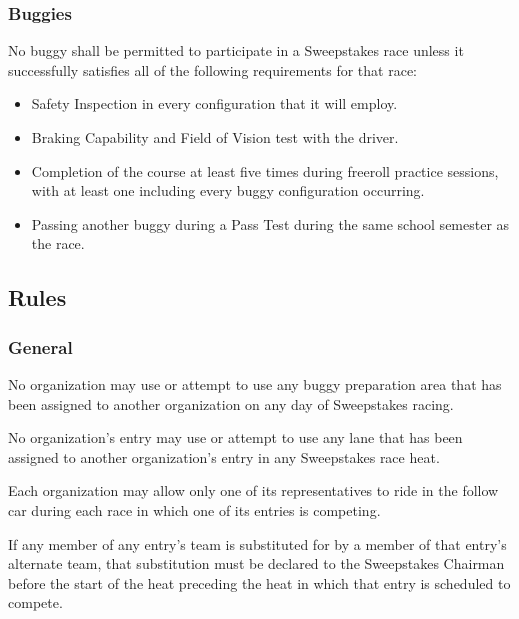 \subsubsection{Buggies}

	No buggy shall be permitted to participate in a Sweepstakes race unless it
	successfully satisfies all of the following requirements for that race:

	\begin{itemize}

		\item Safety Inspection in every configuration that it will employ.

		\item Braking Capability and Field of Vision test with the driver.
		
		\item Completion of the course at least five times during freeroll practice 
		sessions, with at least one including every buggy configuration occurring.

		\item Passing another buggy during a Pass Test during the same school 
		semester as the race.

	\end{itemize}

\subsection{Rules}

\subsubsection{General}

	No organization may use or attempt to use any buggy preparation area that has
	been assigned to another organization on any day of Sweepstakes racing.

	No organization's entry may use or attempt to use any lane that has been
	assigned to another organization's entry in any Sweepstakes race heat.

	Each organization may allow only one of its representatives to ride in the
	follow car during each race in which one of its entries is competing.

	If any member of any entry's team is substituted for by a member of that
	entry's alternate team, that substitution must be declared to the Sweepstakes
	Chairman before the start of the heat preceding the heat in which that entry is
	scheduled to compete.

